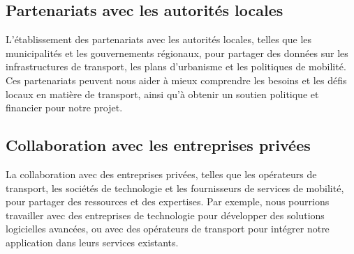 \subsection{Partenariats avec les autorités locales}
L'établissement  des partenariats avec les autorités locales, telles que les municipalités et les gouvernements régionaux, pour partager des données sur les infrastructures de transport, les plans d'urbanisme et les politiques de mobilité. Ces partenariats peuvent nous aider à mieux comprendre les besoins et les défis locaux en matière de transport, ainsi qu'à obtenir un soutien politique et financier pour notre projet.

\subsection{Collaboration avec les entreprises privées}
La collaboration  avec des entreprises privées, telles que les opérateurs de transport, les sociétés de technologie et les fournisseurs de services de mobilité, pour partager des ressources et des expertises. Par exemple, nous pourrions travailler avec des entreprises de technologie pour développer des solutions logicielles avancées, ou avec des opérateurs de transport pour intégrer notre application dans leurs services existants.

